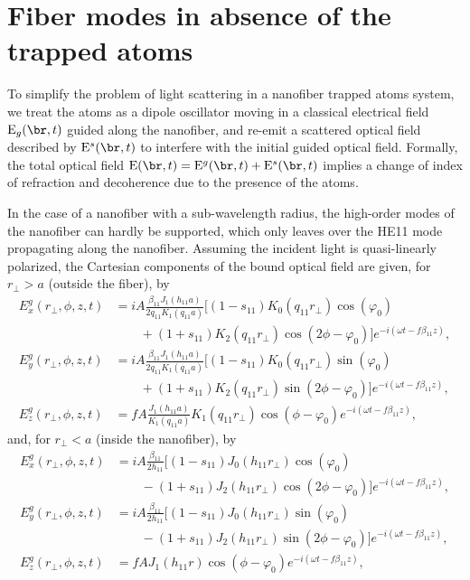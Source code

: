 \documentclass[]{report}
\begin{document}
\section{Fiber modes in absence of the trapped atoms}
To simplify the problem of light scattering in a nanofiber trapped atoms system, we treat the atoms as a dipole oscillator moving in a classical electrical field $ \mathrm{E}_{g}(\br,t) $ guided along the nanofiber, and re-emit a scattered optical field described by $ \mathrm{E}^s(\br,t) $ to interfere with the initial guided optical field. Formally, the total optical field $ \mathrm{E}(\br,t)= \mathrm{E}^g(\br,t)  + \mathrm{E}^s(\br,t) $ implies a change of index of refraction and decoherence due to the presence of the atoms. 

In the case of a nanofiber with a sub-wavelength radius, the high-order modes of the nanofiber can hardly be supported, which only leaves over the HE11 mode propagating along the nanofiber. Assuming the incident light is quasi-linearly polarized, the Cartesian components of the bound optical field are given, for $ r_\perp>a $ (outside the fiber), by~\cite{Lacroute2012,LeKien2004}
\begin{subequations}
\label{Ertrga}
\begin{align}
E_x^g(r_\perp,\phi,z,t) &= iA \frac{\beta_{11}J_1(h_{11}a)}{2q_{11}K_1(q_{11}a)}[(1-s_{11})K_0(q_{11}r_\perp)\cos (\varphi_0) \nonumber\\
&\qquad + (1+s_{11})K_2 (q_{11}r_\perp) \cos (2\phi-\varphi_0) ] e^{-i(\omega t-f\beta_{11}z)},\\
E_y^g(r_\perp,\phi,z,t) &= iA \frac{\beta_{11}J_1(h_{11}a)}{2q_{11}K_1(q_{11}a)}[(1-s_{11})K_0(q_{11}r_\perp)\sin (\varphi_0) \nonumber\\
&\qquad + (1+s_{11})K_2 (q_{11}r_\perp) \sin (2\phi-\varphi_0) ] e^{-i(\omega t-f\beta_{11}z)},\\
E_z^g(r_\perp,\phi,z,t) &= fA \frac{J_1(h_{11}a)}{K_1(q_{11}a)}K_1(q_{11}r_\perp)\cos (\phi-\varphi_0) e^{-i(\omega t-f\beta_{11}z)},
\end{align}
\end{subequations}
and, for $ r_\perp<a $ (inside the nanofiber), by
\begin{subequations}
\label{Ertrla}
\begin{align}
E_x^g(r_\perp,\phi,z,t) &= iA \frac{\beta_{11}}{2h_{11}}[(1-s_{11})J_0(h_{11}r_\perp)\cos (\varphi_0) \nonumber\\
&\qquad - (1+s_{11})J_2 (h_{11}r_\perp) \cos (2\phi-\varphi_0) ] e^{-i(\omega t-f\beta_{11}z)},\\
E_y^g(r_\perp,\phi,z,t) &= iA \frac{\beta_{11}}{2h_{11}}[(1-s_{11})J_0(h_{11}r_\perp)\sin (\varphi_0) \nonumber\\
&\qquad - (1+s_{11})J_2 (h_{11}r_\perp) \sin (2\phi-\varphi_0) ] e^{-i(\omega t-f\beta_{11}z)},\\
E_z^g(r_\perp,\phi,z,t) &= fA J_1(h_{11}r)\cos (\phi-\varphi_0) e^{-i(\omega t-f\beta_{11}z)},
\end{align}
\end{subequations}
\end{document}
